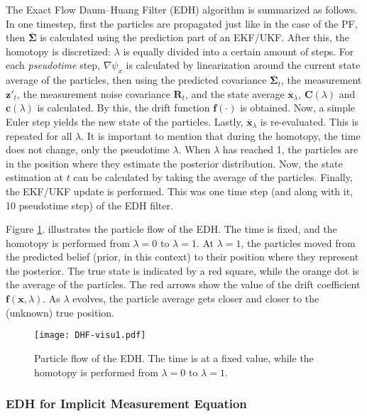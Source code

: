 The Exact Flow Daum--Huang Filter (EDH) algorithm is summarized as follows.
In one timestep, first the particles are propagated just like in the case of the PF, then $\overline{\mathbf{\Sigma}}$ is calculated using the prediction part of an EKF/UKF.  After this, the homotopy is discretized: $\lambda$ is equally divided into a certain amount of steps. For each \emph{pseudotime} step, $\nabla \psi_x$ is calculated  by linearization around the current state average of the particles, then using the predicted covariance $\overline{\mathbf{\Sigma}}_t$, the measurement $\mathbf{z}'_t$, the measurement noise covariance $\mathbf{R}_t$, and the state average $\overline{\mathbf{x}}_\lambda$, $\mathbf{C}(\lambda)$ and $\mathbf{c}(\lambda)$ is calculated. By this, the drift function $\mathbf{f}(\cdot)$ is obtained. Now, a simple Euler step yields the new state of the particles. Lastly, $\overline{\mathbf{x}}_\lambda$ is re-evaluated. This is repeated for all $\lambda$. It is important to mention that during the homotopy, the time does not change, only the pseudotime $\lambda$. When $\lambda$ has reached 1, the particles are in the position where they estimate the posterior distribution. Now, the state estimation at $t$ can be calculated by taking the average of the particles. Finally, the EKF/UKF update is performed. This was one time step (and along with it, 10 pseudotime step) of the EDH filter.

Figure \ref{fig:dhf-ill}. illustrates the particle flow of the EDH. The time is fixed, and the homotopy is performed from $\lambda = 0$ to $\lambda = 1$. At $\lambda = 1$, the particles moved from the predicted belief (prior, in this context) to their position where they represent the posterior. The true state is indicated by a red square, while the orange dot is the average of the particles. The red arrows show the value of the drift coefficient $\mathbf{f}(\mathbf{x},\lambda)$. As $\lambda$ evolves, the particle average gets closer and closer to the (unknown) true position.

\begin{figure}
  \centering
  \texttt{[image: DHF-visu1.pdf]}
  \caption{Particle flow of the EDH. The time is at a fixed value, while the homotopy is performed from $\lambda = 0$ to $\lambda = 1$.}
  \label{fig:dhf-ill}
\end{figure}

\subsubsection{EDH for Implicit Measurement Equation}

